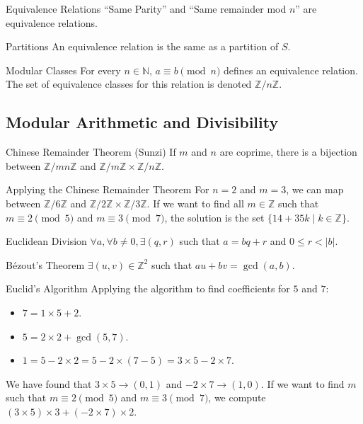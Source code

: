 \documentclass[11pt, a4paper]{article}
\newcommand{\N}{\mathbb{N}}
\newcommand{\Z}{\mathbb{Z}}
\begin{document}
\begin{example}{Equivalence Relations}{}
``Same Parity'' and ``Same remainder mod $n$'' are equivalence relations.
\end{example}

\begin{remark}{Partitions}{}
An equivalence relation is the same as a partition of $S$.
\end{remark}

\begin{definition}{Modular Classes}{}
For every $n \in \N$, $a \equiv b \pmod{n}$ defines an equivalence relation. The set of equivalence classes for this relation is denoted $\Z/n\Z$.
\end{definition}

\subsection{Modular Arithmetic and Divisibility}

\begin{theorem}{Chinese Remainder Theorem (Sunzi)}{}
If $m$ and $n$ are coprime, there is a bijection between $\Z/mn\Z$ and $\Z/m\Z \times \Z/n\Z$.
\end{theorem}

\begin{example}{Applying the Chinese Remainder Theorem}{}
For $n=2$ and $m=3$, we can map between $\Z/6\Z$ and $\Z/2\Z \times \Z/3\Z$.
If we want to find all $m \in \Z$ such that $m \equiv 2 \pmod{5}$ and $m \equiv 3 \pmod{7}$, the solution is the set $\{14 + 35k \mid k \in \Z\}$.
\end{example}

\begin{theorem}{Euclidean Division}{}
$\forall a, \forall b \neq 0, \exists (q, r)$ such that $a = bq + r$ and $0 \leq r < \vert{}b\vert{}$.
\end{theorem}

\begin{theorem}{Bézout's Theorem}{}
$\exists (u, v) \in \Z^2$ such that $au + bv = \gcd(a,b)$.
\end{theorem}

\begin{example}{Euclid's Algorithm}{}
Applying the algorithm to find coefficients for $5$ and $7$:
\begin{itemize}
    \item $7 = 1 \times 5 + 2$.
    \item $5 = 2 \times 2 + \gcd(5,7)$.
    \item $1 = 5 - 2 \times 2 = 5 - 2 \times (7-5) = 3 \times 5 - 2 \times 7$.
\end{itemize}
We have found that $3 \times 5 \rightarrow (0,1)$ and $-2 \times 7 \rightarrow (1,0)$. If we want to find $m$ such that $m \equiv 2 \pmod{5}$ and $m \equiv 3 \pmod{7}$, we compute $(3 \times 5) \times 3 + (-2 \times 7) \times 2$.
\end{example}
\end{document}
